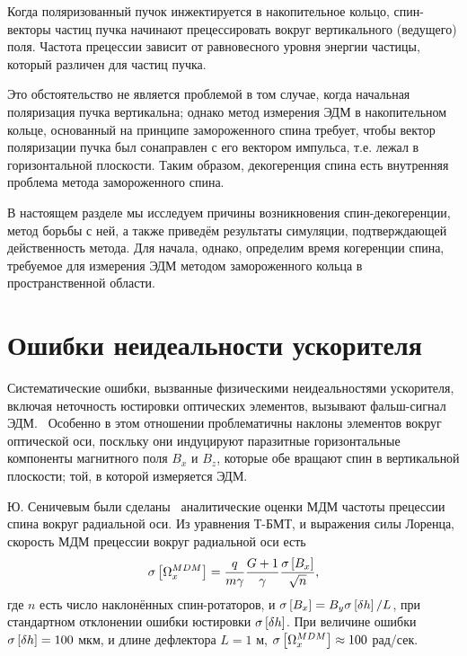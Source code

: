 Когда поляризованный пучок инжектируется в накопительное кольцо, спин-векторы 
частиц пучка начинают прецессировать вокруг вертикального
(ведущего) поля. Частота прецессии зависит от равновесного уровня
энергии частицы, который различен для частиц пучка.

Это обстоятельство не является проблемой в том случае, когда начальная
поляризация пучка вертикальна; однако метод измерения ЭДМ в
накопительном кольце, основанный
на принципе замороженного спина требует, чтобы вектор поляризации
пучка был сонаправлен с его вектором импульса, т.е. лежал в
горизонтальной плоскости. Таким образом, декогеренция спина есть
внутренняя проблема метода замороженного спина.

В настоящем разделе мы исследуем причины возникновения спин-декогеренции,
метод борьбы с ней, а также приведём результаты симуляции, подтверждающей действенность
метода. Для начала, однако, определим время когеренции спина, требуемое для 
измерения ЭДМ методом замороженного кольца в пространственной области.



\section{Ошибки неидеальности ускорителя}\label{chpt3:imperfections}
Систематические ошибки, вызванные физическими неидеальностями
ускорителя, включая неточность юстировки оптических элементов,
вызывают фальш-сигнал ЭДМ.~\cite[стр.~230]{Eremey:Thesis} Особенно в
этом отношении проблематичны наклоны элементов вокруг оптической оси, поскльку они
индуцируют паразитные горизонтальные компоненты магнитного поля $B_x$
и $B_z$, которые обе вращают спин в вертикальной плоскости; той, в которой измеряется ЭДМ.

Ю. Сеничевым были сделаны~\cite{Senichev:FDM} аналитические оценки МДМ частоты прецессии спина
вокруг радиальной оси. Из уравнения Т-БМТ, и выражения силы Лоренца,
скорость МДМ прецессии вокруг радиальной оси есть
\begin{equation}
\SD{\W_x^{MDM}} = \frac{q}{m\gamma}\frac{G+1}{\gamma}\frac{\SD{B_x}}{\sqrt{n}},
\end{equation}
где $n$ есть число наклонённых спин-ротаторов, и $\SD{B_x} = B_y
\SD{\delta h}/L$, при стандартном отклонении ошибки юстировки
$\SD{\delta h}$. При величине ошибки $\SD{\delta h} = 100$ мкм, и
длине дефлектора $L=1$ м, $\SD{\W_x^{MDM}} \approx 100$ рад/сек.~\cite{Senichev:FDM}

